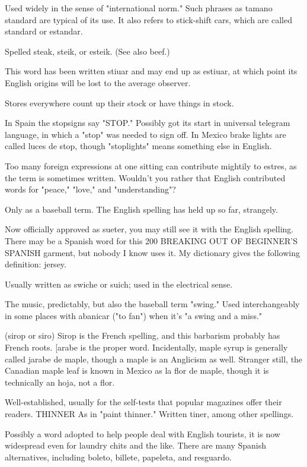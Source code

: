  Used widely in the sense of "international
norm." Such phrases as tamano standard are typical of its use. It
also refers to stick-shift cars, which are called standard or estandar.

 Spelled steak, steik, or esteik. (See also beef.)

 This word has been written stiuar and may end up
as estiuar, at which point its English origins will be lost to the average
observer.

 Stores everywhere count up their stock or have
things in stock.

 In Spain the stopsigns say "STOP." Possibly got its
start in universal telegram language, in which a "stop" was needed to
sign off. In Mexico brake lights are called luces de stop, though "stoplights" means something else in English.

 Too many foreign expressions at one sitting can
contribute mightily to estres, as the term is sometimes written.
Wouldn't you rather that English contributed words for "peace,"
"love," and "understanding"?

 Only as a baseball term. The English spelling has
held up so far, strangely.

 Now officially approved as sueter, you may still
see it with the English spelling. There may be a Spanish word for this
200 BREAKING OUT OF BEGINNER'S SPANISH
garment, but nobody I know uses it. My dictionary gives the following
definition: jersey.

 Usually written as swiche or suich; used in the electrical sense.

 The music, predictably, but also the baseball term
"swing." Used interchangeably in some places with abanicar ("to fan")
when it's "a swing and a miss."

 (sirop or siro) Sirop is the French spelling, and this
barbarism probably has French roots. [arabe is the proper word. Incidentally, maple syrup is generally called jarabe de maple, though a
maple is an Anglicism as well. Stranger still, the Canadian maple leaf
is known in Mexico as la flor de maple, though it is technically an
hoja, not a flor.

 Well-established, usually for the self-tests that popular
magazines offer their readers.
THINNER As in "paint thinner." Written tiner, among other
spellings.

 Possibly a word adopted to help people deal with English tourists, it is now widespread even for laundry chits and the like.
There are many Spanish alternatives, including boleto, billete, papeleta, and resguardo.

